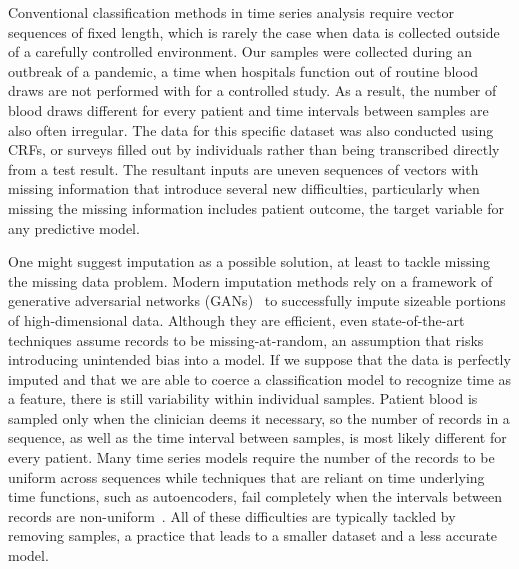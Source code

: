 \documentclass[letterpaper]{article} %
\begin{document}
Conventional classification methods in time series analysis require vector
sequences of fixed length, which is rarely the case when data is collected
outside of a carefully controlled environment. Our samples were collected
during an outbreak of a pandemic, a time when hospitals function out of routine
blood draws are not performed with for a controlled study. As a result, the
number of blood draws different for every patient and  time intervals between
samples are also often irregular. The data for this specific dataset was also
conducted using CRFs, or surveys filled out by individuals rather than being
transcribed directly from a test result. The resultant inputs are uneven
sequences of vectors with missing information that introduce several new
difficulties, particularly when missing the missing information includes
patient outcome, the target variable for any predictive model.

One might suggest imputation as a possible solution, at least to tackle missing
the missing data problem. Modern imputation methods rely on a framework of
generative adversarial networks (GANs)~\cite{yoon2018gain} to successfully impute
sizeable portions of high-dimensional data. Although they are efficient, even
state-of-the-art techniques assume records to be missing-at-random, an
assumption that risks introducing unintended bias into a model. If we suppose
that the data is perfectly imputed and that we are able to coerce
a classification model to recognize time as a feature, there is still
variability within individual samples. Patient blood is sampled only when
the clinician deems it necessary, so the number of records in a sequence, as
well as the time interval between samples, is most likely different for every patient.
Many time series models require the number of the records to be uniform across
sequences while techniques that are reliant on time underlying time functions,
such as autoencoders, fail completely when the intervals between records are
non-uniform~\cite{yu2013embedding}. All of these difficulties are typically tackled by
removing samples, a practice that leads to a smaller dataset and a less
accurate model.

\newpage


\end{document}
